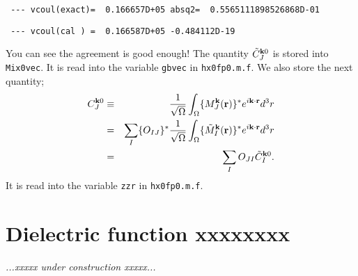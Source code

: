 \documentclass[a4paper,10pt,epsf,fleqn]{article}
\def\underconstruction{{\it...xxxxx under construction xxxxx...\\}}
\begin{document}
\vspace{\baselineskip}

\verb| --- vcoul(exact)=  0.166657D+05 absq2=  0.5565111898526868D-01|

\verb| --- vcoul(cal ) =  0.166587D+05 -0.484112D-19|

\vspace{\baselineskip}

You can see the agreement is good enough!
The quantity $\tilde{C}^{{\bf k}0}_J$ is stored into \verb|Mix0vec|.
It is read into the variable \verb|gbvec| in \verb|hx0fp0.m.f|.
We also store the next quantity;
\begin{eqnarray}
  C^{{\bf k}0}_J
  &\equiv& \frac{1}{\sqrt{\Omega}}\int_{\Omega}
     \{ M_J^{\bf k}({\bf r}) \}^* e^{i{\bf k \cdot r}}d^3r \nonumber \\
  &=& \sum_I \{ O_{IJ} \}^* \frac{1}{\sqrt{\Omega}}\int_{\Omega}
     \{ \tilde{M}_I^{\bf k}({\bf r}) \}^* e^{i{\bf k \cdot r}}d^3r \nonumber \\
  &=& \sum_I O_{JI} \tilde{C}^{{\bf k}0}_I.
\end{eqnarray}
It is read into the variable \verb|zzr| in \verb|hx0fp0.m.f|.

%


\newpage

\section{Dielectric function xxxxxxxx}
\underconstruction
\end{document}
